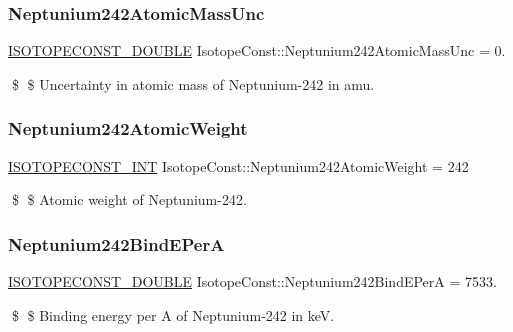 \subsubsection{\texorpdfstring{Neptunium242\+Atomic\+Mass\+Unc}{Neptunium242AtomicMassUnc}}
{\footnotesize\ttfamily \mbox{\hyperlink{group___isotope_const-_macros_ga8f45a7272ce02c0b4c65c44636ed719a}{I\+S\+O\+T\+O\+P\+E\+C\+O\+N\+S\+T\+\_\+\+D\+O\+U\+B\+LE}} Isotope\+Const\+::\+Neptunium242\+Atomic\+Mass\+Unc = 0.}

\$ \$ Uncertainty in atomic mass of Neptunium-\/242 in amu. \mbox{\label{group___isotope_const-_neptunium-_np242_ga799af70eea14eba1641ad1df12789691}} 
\subsubsection{\texorpdfstring{Neptunium242\+Atomic\+Weight}{Neptunium242AtomicWeight}}
{\footnotesize\ttfamily \mbox{\hyperlink{group___isotope_const-_macros_ga5f18360b3e99483a35c32d789e62621c}{I\+S\+O\+T\+O\+P\+E\+C\+O\+N\+S\+T\+\_\+\+I\+NT}} Isotope\+Const\+::\+Neptunium242\+Atomic\+Weight = 242}

\$ \$ Atomic weight of Neptunium-\/242. \mbox{\label{group___isotope_const-_neptunium-_np242_ga591cebf2760f713a14f3ac1bb8145f15}} 
\subsubsection{\texorpdfstring{Neptunium242\+Bind\+E\+PerA}{Neptunium242BindEPerA}}
{\footnotesize\ttfamily \mbox{\hyperlink{group___isotope_const-_macros_ga8f45a7272ce02c0b4c65c44636ed719a}{I\+S\+O\+T\+O\+P\+E\+C\+O\+N\+S\+T\+\_\+\+D\+O\+U\+B\+LE}} Isotope\+Const\+::\+Neptunium242\+Bind\+E\+PerA = 7533.}

\$ \$ Binding energy per A of Neptunium-\/242 in keV. \mbox{\label{group___isotope_const-_neptunium-_np242_ga274d2331625f6a156fcfc223da51b3a7}} 
